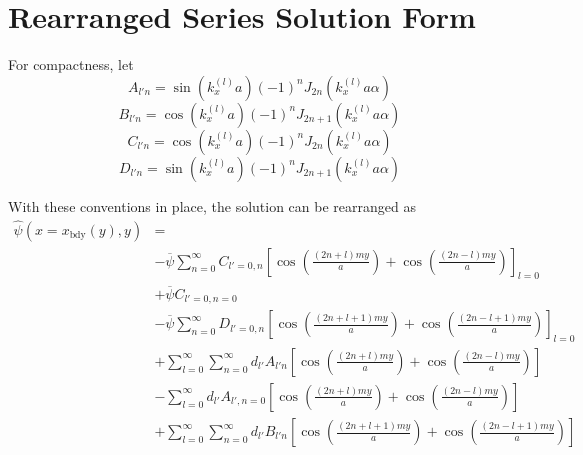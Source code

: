 \documentclass{article}
\begin{document}
\section{Rearranged Series Solution Form}
For compactness, let
\begin{equation}
    A_{l' n}=\sin\left( k_x^{(l)} a \right) (-1)^n J_{2n}\left( k_x^{(l)}a\alpha \right) 
\end{equation} 
\begin{equation}
    B_{l' n}=\cos\left( k_x^{(l)}a \right) (-1)^n J_{2n+1}\left( k_x^{(l)}a\alpha \right) 
\end{equation} 
\begin{equation}
    C_{l' n}=\cos\left( k_x^{(l)} a \right) (-1)^n J_{2n}\left( k_x^{(l)}a\alpha \right) 
\end{equation} 
\begin{equation}
    D_{l' n}=\sin\left( k_x^{(l)}a \right) (-1)^n J_{2n+1}\left( k_x^{(l)}a\alpha \right) 
\end{equation} 

With these conventions in place, the solution can be rearranged as
\begin{equation}
    \begin{split}
        \hat{\psi}\left( x=x_{\text{bdy}}(y), y \right) &= \\
                                                        &-\overline{\psi} \sum_{n=0}^{\infty} C_{l'=0,n} \left[\cos\left( \frac{(2n+l)my}{a} \right) + \cos\left( \frac{(2n-l)my}{a} \right) \right]_{l=0} \\
                                                        &+\overline{\psi} C_{l'=0,n=0} \\
                                                        &-\overline{\psi} \sum_{n=0}^{\infty} D_{l'=0,n} \left[\cos\left( \frac{(2n+l+1)my}{a} \right) + \cos\left( \frac{(2n-l+1)my}{a} \right) \right]_{l=0} \\
                                                        &+\sum_{l=0}^{\infty} \sum_{n=0}^{\infty} d_{l'} A_{l' n} \left[\cos\left( \frac{(2n+l)my}{a} \right) + \cos\left( \frac{(2n-l)my}{a} \right) \right] \\
                                                        &-\sum_{l=0}^{\infty} d_{l'} A_{l',n=0} \left[\cos\left( \frac{(2n+l)my}{a} \right) + \cos\left( \frac{(2n-l)my}{a} \right) \right] \\
                                                        &+\sum_{l=0}^{\infty} \sum_{n=0}^{\infty} d_{l'} B_{l' n} \left[\cos\left( \frac{(2n+l+1)my}{a} \right) + \cos\left( \frac{(2n-l+1)my}{a} \right) \right]
    \end{split}
\end{equation} 
\end{document}
